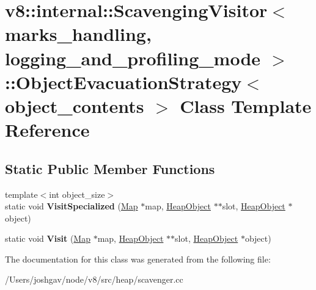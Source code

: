 \hypertarget{classv8_1_1internal_1_1_scavenging_visitor_1_1_object_evacuation_strategy}{}\section{v8\+:\+:internal\+:\+:Scavenging\+Visitor$<$ marks\+\_\+handling, logging\+\_\+and\+\_\+profiling\+\_\+mode $>$\+:\+:Object\+Evacuation\+Strategy$<$ object\+\_\+contents $>$ Class Template Reference}
\label{classv8_1_1internal_1_1_scavenging_visitor_1_1_object_evacuation_strategy}
\subsection*{Static Public Member Functions}
\begin{DoxyCompactItemize}
\item 
{\footnotesize template$<$int object\+\_\+size$>$ }\\static void {\bfseries Visit\+Specialized} (\hyperlink{classv8_1_1internal_1_1_map}{Map} $\ast$map, \hyperlink{classv8_1_1internal_1_1_heap_object}{Heap\+Object} $\ast$$\ast$slot, \hyperlink{classv8_1_1internal_1_1_heap_object}{Heap\+Object} $\ast$object)\hypertarget{classv8_1_1internal_1_1_scavenging_visitor_1_1_object_evacuation_strategy_afa5eb952cb11dadd9bad5d6a13dd31ac}{}\label{classv8_1_1internal_1_1_scavenging_visitor_1_1_object_evacuation_strategy_afa5eb952cb11dadd9bad5d6a13dd31ac}

\item 
static void {\bfseries Visit} (\hyperlink{classv8_1_1internal_1_1_map}{Map} $\ast$map, \hyperlink{classv8_1_1internal_1_1_heap_object}{Heap\+Object} $\ast$$\ast$slot, \hyperlink{classv8_1_1internal_1_1_heap_object}{Heap\+Object} $\ast$object)\hypertarget{classv8_1_1internal_1_1_scavenging_visitor_1_1_object_evacuation_strategy_a5543ffd0f938bbd89c4d479455f1910c}{}\label{classv8_1_1internal_1_1_scavenging_visitor_1_1_object_evacuation_strategy_a5543ffd0f938bbd89c4d479455f1910c}

\end{DoxyCompactItemize}


The documentation for this class was generated from the following file\+:\begin{DoxyCompactItemize}
\item 
/\+Users/joshgav/node/v8/src/heap/scavenger.\+cc\end{DoxyCompactItemize}

